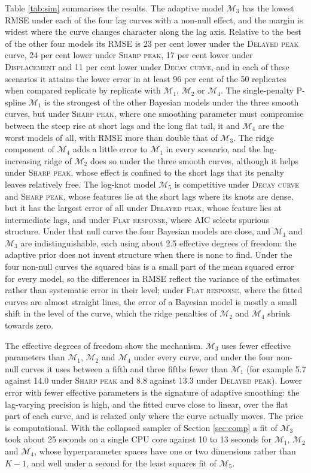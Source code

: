 \documentclass[11pt]{article}
\newcommand{\M}[1]{\mathcal{M}_{#1}}
\newcommand{\scen}[1]{\textsc{#1}}
\begin{document}
Table \ref{tab:sim} summarises the results. The adaptive model $\M{3}$ has
the lowest RMSE under each of the four lag curves with a non-null effect,
and the margin is widest where the curve changes character along the lag
axis. Relative to the best of the other four models its RMSE is 23 per cent
lower under the \scen{Delayed peak} curve, 24 per cent lower under
\scen{Sharp peak}, 17 per cent lower under \scen{Displacement} and 11 per
cent lower under \scen{Decay curve}, and in each of these scenarios it
attains the lower error in at least 96 per cent of the 50 replicates when
compared replicate by replicate with $\M{1}$, $\M{2}$ or $\M{4}$. The
single-penalty P-spline $\M{1}$ is the strongest of the other Bayesian
models under the three smooth curves, but under \scen{Sharp peak}, where one
smoothing parameter must compromise between the steep rise at short lags
and the long flat tail, it and $\M{4}$ are the worst models of all, with
RMSE more than double that of $\M{3}$. The ridge component of $\M{4}$ adds a little error to $\M{1}$ in
every scenario, and the lag-increasing ridge of $\M{2}$ does so under the
three smooth curves, although it helps under \scen{Sharp peak}, whose effect
is confined to the short lags that its penalty leaves relatively free. The
log-knot model $\M{5}$ is competitive under \scen{Decay curve} and
\scen{Sharp peak}, whose features lie at the short lags where its knots are
dense, but it has the largest error of all under \scen{Delayed peak}, whose
feature lies at intermediate lags, and under \scen{Flat response}, where AIC
selects spurious structure. Under that null curve the four Bayesian models
are close, and $\M{1}$ and $\M{3}$ are indistinguishable, each using about
2.5 effective degrees of freedom: the adaptive prior does not invent
structure when there is none to find. Under the four non-null curves the
squared bias is a small part of the mean squared error for every model, so
the differences in RMSE reflect the variance of the estimates rather than
systematic error in their level; under \scen{Flat response}, where the
fitted curves are almost straight lines, the error of a Bayesian model is
mostly a small shift in the level of the curve, which the ridge penalties of
$\M{2}$ and $\M{4}$ shrink towards zero.

The effective degrees of freedom show the mechanism. $\M{3}$ uses fewer
effective parameters than $\M{1}$, $\M{2}$ and $\M{4}$ under every curve,
and under the four non-null curves it uses between a fifth and three fifths
fewer than $\M{1}$ (for example 5.7 against 14.0 under \scen{Sharp peak} and
8.8 against 13.3 under \scen{Delayed peak}). Lower error with fewer
effective parameters is the signature of adaptive smoothing: the lag-varying
precision is high, and the fitted curve close to linear, over the flat part
of each curve, and is relaxed only where the curve actually moves. The
price is computational. With the collapsed sampler of Section
\ref{sec:comp} a fit of $\M{3}$ took about 25 seconds on a single CPU core
against 10 to 13 seconds for $\M{1}$, $\M{2}$ and $\M{4}$, whose
hyperparameter spaces have one or two dimensions rather than $K - 1$, and
well under a second for the least squares fit of $\M{5}$.
\end{document}

